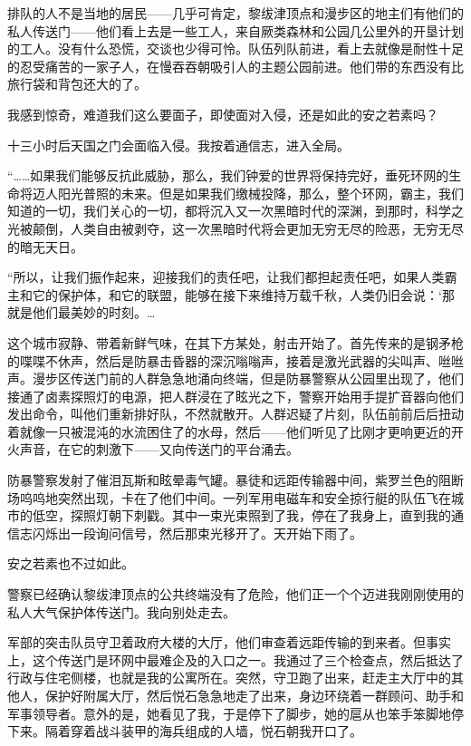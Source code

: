 \documentclass[AutoFakeBold=true]{book}
\begin{document}
排队的人不是当地的居民——几乎可肯定，黎绂津顶点和漫步区的地主们有他们的私人传送门——他们看上去是一些工人，来自厥类森林和公园几公里外的开垦计划的工人。没有什么恐慌，交谈也少得可怜。队伍列队前进，看上去就像是耐性十足的忍受痛苦的一家子人，在慢吞吞朝吸引人的主题公园前进。他们带的东西没有比旅行袋和背包还大的了。

我感到惊奇，{\kaishu 难道我们这么要面子，即使面对入侵，还是如此的安之若素吗？}

十三小时后天国之门会面临入侵。我按着通信志，进入全局。

``……如果我们能够反抗此威胁，那么，我们钟爱的世界将保持完好，垂死环网的生命将迈人阳光普照的未来。但是如果我们缴械投降，那么，整个环网，霸主，我们知道的一切，我们关心的一切，都将沉入又一次黑暗时代的深渊，到那时，科学之光被颠倒，人类自由被剥夺，这一次黑暗时代将会更加无穷无尽的险恶，无穷无尽的暗无天日。

``所以，让我们振作起来，迎接我们的责任吧，让我们都担起责任吧，如果人类霸主和它的保护体，和它的联盟，能够在接下来维持万载千秋，人类仍旧会说：`那就是他们最美妙的时刻。…

这个城市寂静、带着新鲜气味，在其下方某处，射击开始了。首先传来的是钢矛枪的喋喋不休声，然后是防暴击昏器的深沉嗡嗡声，接着是激光武器的尖叫声、咝咝声。漫步区传送门前的人群急急地涌向终端，但是防暴警察从公园里出现了，他们接通了卤素探照灯的电源，把人群浸在了眩光之下，警察开始用手提扩音器向他们发出命令，叫他们重新排好队，不然就散开。人群迟疑了片刻，队伍前前后后扭动着就像一只被混沌的水流困住了的水母，然后——他们听见了比刚才更响更近的开火声音，在它的刺激下——又向传送门的平台涌去。

防暴警察发射了催泪瓦斯和眩晕毒气罐。暴徒和远距传输器中间，紫罗兰色的阻断场呜呜地突然出现，卡在了他们中间。一列军用电磁车和安全掠行艇的队伍飞在城市的低空，探照灯朝下刺戳。其中一束光束照到了我，停在了我身上，直到我的通信志闪烁出一段询问信号，然后那束光移开了。天开始下雨了。

{\kaishu 安之若素也不过如此。}

警察已经确认黎绂津顶点的公共终端没有了危险，他们正一个个迈进我刚刚使用的私人大气保护体传送门。我向别处走去。

军部的突击队员守卫着政府大楼的大厅，他们审查着远距传输的到来者。但事实上，这个传送门是环网中最难企及的入口之一。我通过了三个检查点，然后抵达了行政与住宅侧楼，也就是我的公寓所在。突然，守卫跑了出来，赶走主大厅中的其他人，保护好附属大厅，然后悦石急急地走了出来，身边环绕着一群顾问、助手和军事领导者。意外的是，她看见了我，于是停下了脚步，她的扈从也笨手笨脚地停下来。隔着穿着战斗装甲的海兵组成的人墙，悦石朝我开口了。
\end{document}
